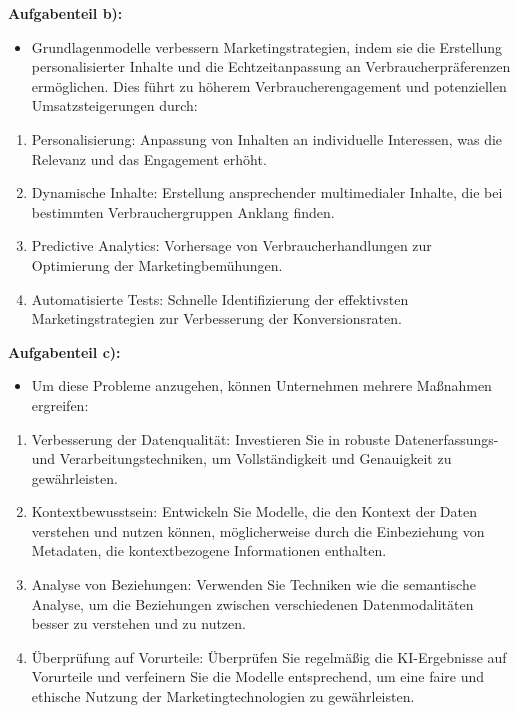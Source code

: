 \documentclass[12pt,ngerman]{AssignmentClass}
\begin{document}
        \textbf{Aufgabenteil b):}
        \begin{itemize}
            \item Grundlagenmodelle verbessern Marketingstrategien, indem sie die Erstellung personalisierter Inhalte und die Echtzeitanpassung an Verbraucherpräferenzen ermöglichen. Dies führt zu höherem Verbraucherengagement und potenziellen Umsatzsteigerungen durch:
        \end{itemize}
            \begin{enumerate}
                \item Personalisierung: Anpassung von Inhalten an individuelle Interessen, was die Relevanz und das Engagement erhöht.
                \item Dynamische Inhalte: Erstellung ansprechender multimedialer Inhalte, die bei bestimmten Verbrauchergruppen Anklang finden.
                \item Predictive Analytics: Vorhersage von Verbraucherhandlungen zur Optimierung der Marketingbemühungen.
                \item Automatisierte Tests: Schnelle Identifizierung der effektivsten Marketingstrategien zur Verbesserung der Konversionsraten.
            \end{enumerate}

        \textbf{Aufgabenteil c):}
        \begin{itemize}
            \item Um diese Probleme anzugehen, können Unternehmen mehrere Maßnahmen ergreifen:
        \end{itemize}
            \begin{enumerate}
                \item Verbesserung der Datenqualität: Investieren Sie in robuste Datenerfassungs- und Verarbeitungstechniken, um Vollständigkeit und Genauigkeit zu gewährleisten.
                \item Kontextbewusstsein: Entwickeln Sie Modelle, die den Kontext der Daten verstehen und nutzen können, möglicherweise durch die Einbeziehung von Metadaten, die kontextbezogene Informationen enthalten.
                \item Analyse von Beziehungen: Verwenden Sie Techniken wie die semantische Analyse, um die Beziehungen zwischen verschiedenen Datenmodalitäten besser zu verstehen und zu nutzen.
                \item Überprüfung auf Vorurteile: Überprüfen Sie regelmäßig die KI-Ergebnisse auf Vorurteile und verfeinern Sie die Modelle entsprechend, um eine faire und ethische Nutzung der Marketingtechnologien zu gewährleisten.
            \end{enumerate}
      
\end{document}
